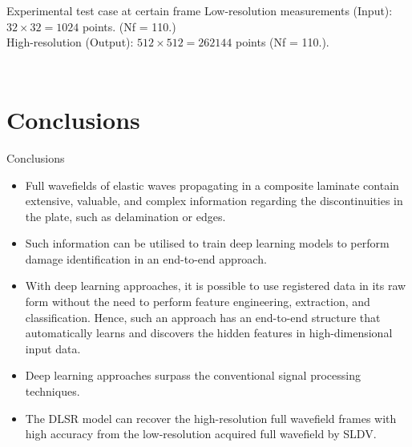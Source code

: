 \documentclass[10pt,aspectratio=169,dvipsnames]{beamer} %
\newcounter{angle}
\begin{document}
		\setcounter{subfigure}{0}
		\begin{frame}{Experimental test case at certain frame}
			Low-resolution measurements (Input): \(32\times32=1024\) points. (Nf = 110.)\\
			High-resolution (Output): \(512\times512=262144\) points (Nf = 110.).
			\begin{columns}[T]
				\begin{column}[c]{0.3\textwidth}
					\begin{figure}						
					\end{figure}
				\end{column}
				\begin{column}[c]{0.66\textwidth}
					\begin{figure}
						\quad
						\quad
						\quad
						\quad
						\quad
						\quad
					\end{figure}
				\end{column}				
			\end{columns}
		\end{frame}
		\section{Conclusions}
		\begin{frame}{Conclusions}
			\footnotesize
			\begin{itemize}
				\item Full wavefields of elastic waves propagating in a composite laminate contain extensive, valuable, and complex information regarding the discontinuities in the plate, such as delamination or edges.
				\item Such information can be utilised to train deep learning models
				to perform damage identification in an end-to-end approach.
				\item With deep	learning approaches, it is possible to use registered data in its raw form without the need to perform feature engineering, extraction, and classification. 
				Hence, such an approach has an end-to-end structure that automatically learns and discovers the hidden features in high-dimensional input data.
				\item Deep learning approaches surpass the conventional signal processing techniques.
				\item The DLSR model can recover the high-resolution full wavefield
				frames with high accuracy from the low-resolution acquired full wavefield by SLDV.
			\end{itemize}
		\end{frame}
		
\end{document}
